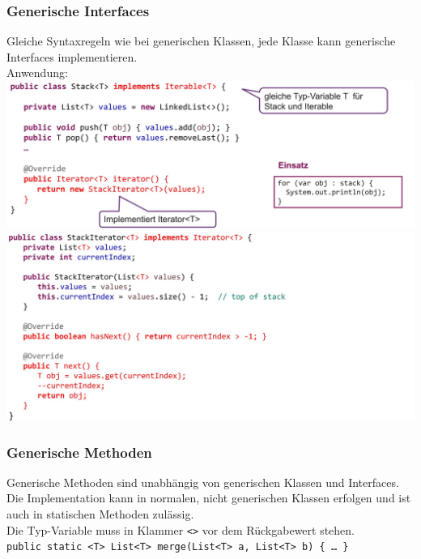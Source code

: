 \subsubsection{Generische Interfaces}\label{StackIterator}
Gleiche Syntaxregeln wie bei generischen Klassen, jede Klasse kann generische Interfaces implementieren.\\
Anwendung:\\
\includegraphics[width=\linewidth]{pictures/generic-interface1.jpg}
\includegraphics[width=\linewidth]{pictures/generic-interface2.jpg}

\subsubsection{Generische Methoden}
Generische Methoden sind unabhängig von generischen Klassen und Interfaces. Die Implementation kann in normalen, 
nicht generischen Klassen erfolgen und ist auch in statischen Methoden zulässig.\\
Die Typ-Variable muss in Klammer \verb|<>| vor dem Rückgabewert stehen. \\
\verb|public static <T> List<T> merge(List<T> a, List<T> b) { … }|

